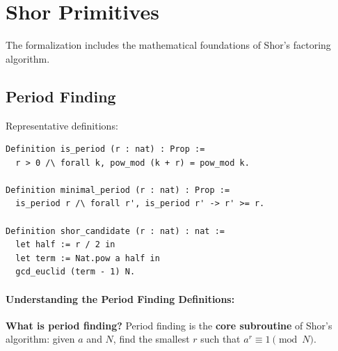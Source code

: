 \section{Shor Primitives}


The formalization includes the mathematical foundations of Shor's factoring algorithm.

\subsection{Period Finding}

Representative definitions:
\begin{lstlisting}
Definition is_period (r : nat) : Prop :=
  r > 0 /\ forall k, pow_mod (k + r) = pow_mod k.

Definition minimal_period (r : nat) : Prop :=
  is_period r /\ forall r', is_period r' -> r' >= r.

Definition shor_candidate (r : nat) : nat :=
  let half := r / 2 in
  let term := Nat.pow a half in
  gcd_euclid (term - 1) N.
\end{lstlisting}

\paragraph{Understanding the Period Finding Definitions:}

\textbf{What is period finding?} Period finding is the \textbf{core subroutine} of Shor's algorithm: given $a$ and $N$, find the smallest $r$ such that $a^r \equiv 1 \pmod{N}$.

